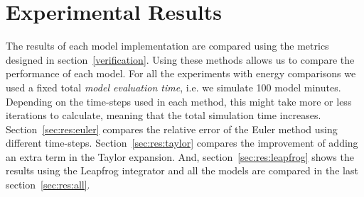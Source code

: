 \documentclass[11pt]{article} %
\begin{document}
\section{Experimental Results}
\label{sec:results}
The results of each model implementation are compared using the metrics designed in section~\ref{verification}. Using these methods allows us to compare the performance of each model. For all the experiments with energy comparisons we used a fixed total \textit{model evaluation time}, i.e. we simulate 100 model minutes. Depending on the time-steps used in each method, this might take more or less iterations to calculate, meaning that the total simulation time increases. Section~\ref{sec:res:euler} compares the relative error of the Euler method using different time-steps. Section~\ref{sec:res:taylor} compares the improvement of adding an extra term in the Taylor expansion. And, section~\ref{sec:res:leapfrog} shows the results using the Leapfrog integrator and all the models are compared in the last section~\ref{sec:res:all}.
\end{document}
